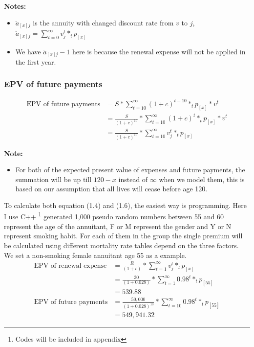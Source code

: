 \documentclass{report}
\begin{document}
\textbf{Notes:}
\begin{itemize}
\item $\ddot{a}_{[x]j}$ is the annuity with changed discount rate from $v$ to $j$,  $\ddot{a}_{[x]j} = \sum_{t=0}^{\infty} v_j^t * _tp_{[x]}$
\item We have $\ddot{a}_{[x]j} - 1$ here is because the renewal expense will not be applied in the first year.
\end{itemize}

\subsubsection{EPV of future payments}
\begin{align}
        \text{EPV of future payments} &= S * \sum_{t=10}^{\infty} (1 + c )^{t-10} * _tp_{[x]} * v^t \nonumber \\
         &= \frac{S}{(1+c)^{10}}* \sum_{t=10}^{\infty} (1 + c )^{t} * _tp_{[x]} * v^t \nonumber \\
         &= \frac{S}{(1+c)^{10}} * \sum_{t=10}^{\infty} v_j^t * _tp_{[x]}
\end{align}

\textbf{Note:}
\begin{itemize}
\item For both of the expected present value of expenses and future payments, the summation will be up till $120-x$ instead of $\infty$ when we model them, this is based on our assumption that all lives will cease before age 120. 
\end{itemize}



To calculate both equation (1.4) and (1.6), the easiest way is programming. Here I use C++ \footnote{Codes will be included in appendix} generated 1,000 pseudo random numbers between 55 and 60 represent the age of the annuitant, F or M represent the gender and Y or N represent smoking habit. For each of them in the group the single premium will be calculated using different mortality rate tables depend on the three factors. We set a non-smoking female annuitant age 55 as a example.
\begin{align}
        \text{EPV of renewal expense}&= \frac{R}{(1+c)} * \sum_{t=1}^{\infty} v_j^t * _tp_{[x]} \nonumber \\
         &= \frac{30}{(1+0.028)} * \sum_{t=1}^{\infty} 0.98^t * _tp_{[55]} \nonumber\\
         &= 539.88\nonumber\\
        \text{EPV of future payments} &= \frac{50,000}{(1+0.028)^{10}} * \sum_{t=10}^{\infty} 0.98^t * _tp_{[55]} \nonumber\\ 
         &=549,941.32 \nonumber
\end{align}
\end{document}
